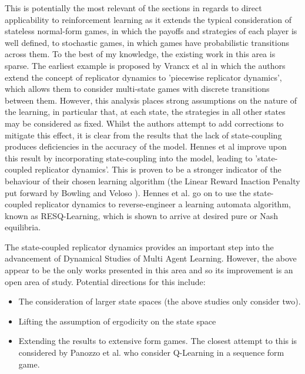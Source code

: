 \documentclass[../sample.tex]{subfiles}
\begin{document}
    This is potentially the most relevant of the sections in regards to direct applicability to
    reinforcement learning as it extends the typical consideration of stateless normal-form games,
    in which the payoffs and strategies of each player is well defined, to stochastic games, in
    which games have probabilistic transitions across them. To the best of my knowledge, the
    existing work in this area is sparse. The earliest example is proposed by Vrancx et al 
    \cite{Vrancx2008} in which the authors extend the concept of replicator dynamics to 'piecewise
    replicator dynamics', which allows them to consider multi-state games with discrete transitions
    between them. However, this analysis places strong assumptions on the nature of the learning, in
    particular that, at each state, the strategies in all other states may be considered as fixed.
    Whilst the authors attempt to add corrections to mitigate this effect, it is clear from the
    results that the lack of state-coupling produces deficiencies in the accuracy of the model.
    Hennes et al \cite{Hennes2009} improve upon this result by incorporating state-coupling into the
    model, leading to 'state-coupled replicator dynamics'. This is proven to be a stronger indicator
    of the behaviour of their chosen learning algorithm (the Linear Reward Inaction Penalty put
    forward by Bowling and Veloso \cite{LRI}). Hennes et al. \cite{Hennes2010} go on to use the
    state-coupled replicator dynamics to reverse-engineer a learning automata algorithm, known as
    RESQ-Learning, which is shown to arrive at desired pure or Nash equilibria. 

    The state-coupled replicator dynamics provides an important step into the advancement of
    Dynamical Studies of Multi Agent Learning. However, the above appear to be the only works
    presented in this area and so its improvement is an open area of study. Potential directions for
    this include:

    \begin{itemize}
        \item The consideration of larger state spaces (the above studies only consider two).
        \item Lifting the assumption of ergodicity on the state space
        \item Extending the results to extensive form games. The closest attempt to this is
        considered by Panozzo et al. \cite{Panozzo} who consider Q-Learning in a sequence form game.
    \end{itemize}
\end{document}
